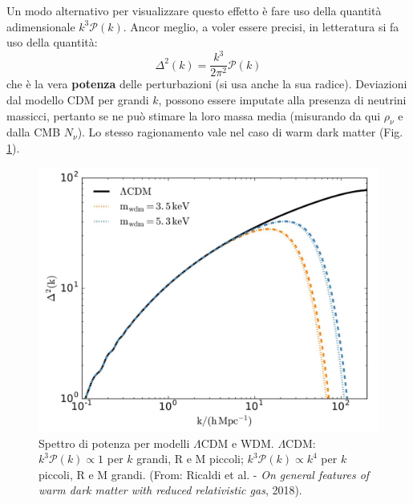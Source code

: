 Un modo alternativo per visualizzare questo effetto è fare uso della quantità adimensionale $k^3\mathcal{P}(k)$. Ancor meglio, a voler essere precisi, in letteratura si fa uso della quantità:
\begin{equation}
    \Delta^2(k) = \frac{k^3}{2\pi^2}\mathcal{P}(k)
\end{equation}
che è la vera \textbf{potenza} delle perturbazioni (si usa anche la sua radice). Deviazioni dal modello CDM per grandi $k$, possono essere imputate alla presenza di neutrini massicci, pertanto se ne può stimare la loro massa media (misurando da qui $\rho_\nu$ e dalla CMB $N_\nu$). Lo stesso ragionamento vale nel caso di warm dark matter (Fig. \ref{fig8:bella4}).


\begin{figure}[H]
    \centering
    \includegraphics[width=.53 \textwidth]{Pictures/8/tris4.jpg}
    \vspace*{-1em}
    \caption{Spettro di potenza per modelli $\Lambda$CDM e WDM. $\Lambda$CDM: $k^3\mathcal{P}(k)\propto 1$ per $k$ grandi, R e M piccoli; $k^3\mathcal{P}(k)\propto k^4$ per $k$ piccoli, R e M grandi.  (From: Ricaldi et al. - \textit{On general features of warm dark matter with reduced relativistic
    gas}, 2018).} \label{fig8:bella4}
\end{figure}

